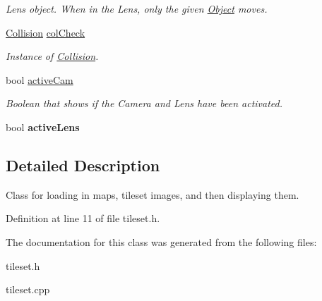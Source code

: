 \begin{DoxyCompactItemize}
\begin{DoxyCompactList}\small\item\em Lens object. When in the Lens, only the given \hyperlink{classObject}{Object} moves. \end{DoxyCompactList}\item 
\hyperlink{classCollision}{Collision} \hyperlink{classTileset_a16c70ebbbd2ed213f4485b953f65ce3a}{col\+Check}\hypertarget{classTileset_a16c70ebbbd2ed213f4485b953f65ce3a}{}\label{classTileset_a16c70ebbbd2ed213f4485b953f65ce3a}

\begin{DoxyCompactList}\small\item\em Instance of \hyperlink{classCollision}{Collision}. \end{DoxyCompactList}\item 
bool \hyperlink{classTileset_ac7dd26d0c9f4e14b0e8d03d48359a90e}{active\+Cam}\hypertarget{classTileset_ac7dd26d0c9f4e14b0e8d03d48359a90e}{}\label{classTileset_ac7dd26d0c9f4e14b0e8d03d48359a90e}

\begin{DoxyCompactList}\small\item\em Boolean that shows if the Camera and Lens have been activated. \end{DoxyCompactList}\item 
bool {\bfseries active\+Lens}\hypertarget{classTileset_a49bf1c831399e566e2661029f9d24bd1}{}\label{classTileset_a49bf1c831399e566e2661029f9d24bd1}

\end{DoxyCompactItemize}


\subsection{Detailed Description}
Class for loading in maps, tileset images, and then displaying them. 

Definition at line 11 of file tileset.\+h.



The documentation for this class was generated from the following files\+:\begin{DoxyCompactItemize}
\item 
tileset.\+h\item 
tileset.\+cpp\end{DoxyCompactItemize}
